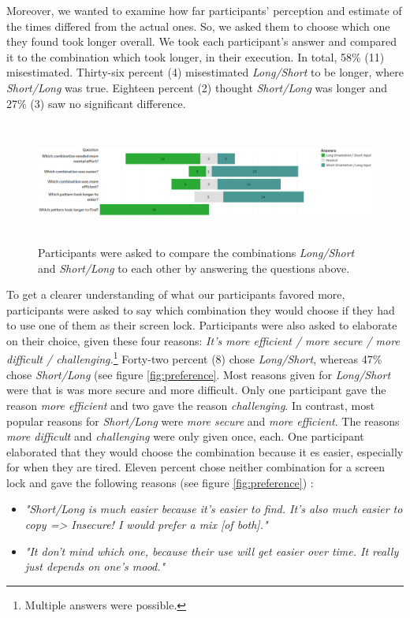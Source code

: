 Moreover, we wanted to examine how far participants' perception and estimate of the times differed from the actual ones. So, we asked them to choose which one they found took longer overall. We took each participant's answer and compared it to the combination which took longer, in their execution. In total, 58\% (11) misestimated. Thirty-six percent (4) misestimated \textit{Long/Short} to be longer, where \textit{Short/Long} was true. Eighteen percent (2) thought \textit{Short/Long} was longer and 27\% (3) saw no significant difference. \\

\begin{figure}[t!]
\centering
\includegraphics[width=15cm, height=4cm]{Chapters/graphics/Likert2.png}
\caption{Participants were asked to compare the combinations \textit{Long/Short} and \textit{Short/Long} to each other by answering the questions above.  }
\label{fig:likert2}
\end{figure}

To get a clearer understanding of what our participants favored more, participants were asked to say which combination they would choose if they had to use one of them as their screen lock. Participants were also asked to elaborate on their choice, given these four reasons: \textit{It's more efficient / more secure / more difficult / challenging.}\footnote{Multiple answers were possible.}
Forty-two percent (8) chose \textit{Long/Short}, whereas 47\% chose \textit{Short/Long} (see figure \ref{fig:preference}. Most reasons given for \textit{Long/Short} were that is was more secure and more difficult. Only one participant gave the reason \textit{more efficient} and two gave the reason \textit{challenging}. In contrast, most popular reasons for \textit{Short/Long} were \textit{more secure} and \textit{more efficient}. The reasons \textit{more difficult} and \textit{challenging} were only given once, each. One participant elaborated that they would choose the combination because it es easier, especially for when they are tired. Eleven percent chose neither combination for a screen lock and gave the following reasons (see figure \ref{fig:preference}) : 
\begin{itemize}
    \item \textit{"Short/Long is much easier because it's easier to find. It's also much easier to copy => Insecure! I would prefer a mix [of both]."}
    \item \textit{"It don't mind which one, because their use will get easier over time. It really just depends on one's mood."} 
\end{itemize}

